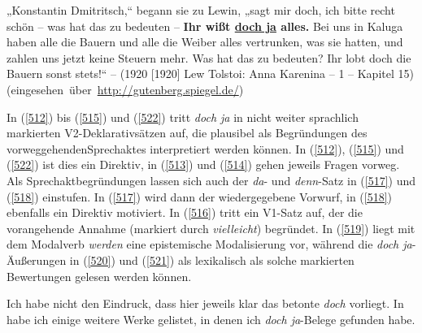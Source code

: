 \begin{exe}
	\ex\label{522} 

	„Konstantin Dmitritsch,“ begann sie zu Lewin, „sagt mir doch, ich bitte recht schön – was hat das zu 				bedeuten – \textbf{Ihr wißt 			\underline{doch ja} alles.} Bei uns in Kaluga haben alle die Bauern und alle die 			Weiber alles vertrunken, was sie hatten, und zahlen uns jetzt keine Steuern mehr. Was hat das zu bedeuten? Ihr lobt doch die 	Bauern sonst stets!“ – \newline
	\hbox{}\hfill(1920 [1920] Lew Tolstoi: Anna Karenina – 1 – Kapitel 15)
	\newline
	\hbox{}\hfill\hbox{(eingesehen über \url{http://gutenberg.spiegel.de/})}
\end{exe}					 
In (\ref{512}) bis (\ref{515}) und (\ref{522}) tritt \textit{doch ja} in nicht weiter sprachlich markierten V2-Deklarativsätzen auf, die plausibel als Begründungen des vorweggehenden\linebreak Sprechaktes interpretiert werden können. In (\ref{512}), (\ref{515}) und (\ref{522}) ist dies ein Direktiv, in (\ref{513}) und (\ref{514}) gehen jeweils Fragen vorweg. Als Sprechaktbegründungen  lassen sich auch der \textit{da}- und \textit{denn}-Satz in (\ref{517}) und (\ref{518}) einstufen. In (\ref{517}) wird dann der wiedergegebene  Vorwurf, in (\ref{518}) ebenfalls ein Direktiv  motiviert. In (\ref{516}) tritt ein V1-Satz auf, der die vorangehende Annahme (markiert durch \textit{vielleicht}) begründet. In (\ref{519}) liegt mit dem Modalverb \textit{werden} eine epistemische Modalisierung  vor, während die \textit{doch ja}-Äußerungen in (\ref{520}) und (\ref{521}) als lexikalisch als solche markierten Bewertungen gelesen werden können. 

Ich habe nicht den Eindruck, dass hier jeweils klar das betonte \textit{doch} vorliegt. In  habe ich einige weitere Werke gelistet, in denen ich \textit{doch ja}-Belege gefunden habe.
								                        
